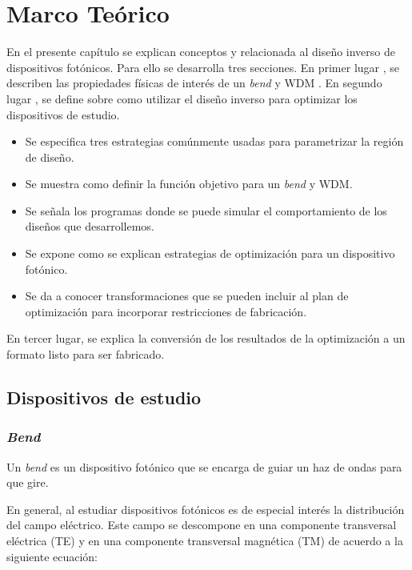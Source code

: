 \chapter{Marco  Teórico}

En el presente capítulo se explican  conceptos  y  relacionada al diseño inverso de dispositivos fotónicos.
Para ello se desarrolla tres secciones. 
En primer lugar , se describen las propiedades físicas de interés de un \emph{bend} y WDM .
En segundo lugar , se define  sobre como utilizar el diseño inverso para optimizar los dispositivos de estudio.
  \begin{itemize}
  \item Se especifica tres estrategias comúnmente usadas para parametrizar la región de diseño.
  \item Se muestra como definir la función objetivo para un \emph{bend} y WDM.
  \item Se señala los programas donde se puede simular el comportamiento de los diseños que desarrollemos.
  \item Se expone como se explican estrategias de optimización para un dispositivo fotónico.
  \item Se da a conocer transformaciones que se pueden incluir al plan de optimización para incorporar restricciones de fabricación.
  \end{itemize}  
En tercer lugar, se explica la conversión de los resultados de la optimización a un formato listo para ser fabricado.


\section{Dispositivos de estudio}

\subsection{\emph{Bend}}

Un \emph{bend} es un dispositivo fotónico que se encarga de guiar un haz de ondas para que gire.

En general, al estudiar dispositivos fotónicos es de especial interés la distribución del campo eléctrico. 
Este campo se descompone en una componente transversal eléctrica (TE) y en una componente transversal magnética (TM) de acuerdo a la siguiente ecuación:

